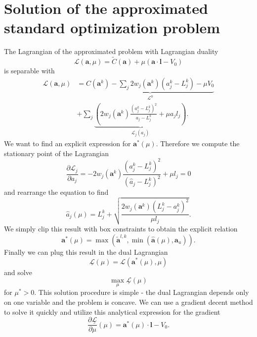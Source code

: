 \section{Solution of the approximated standard optimization problem}
\label{sec:sizing:solution}
The Lagrangian of the approximated problem with Lagrangian duality
\begin{equation}
    \mathcal{L}(\mathbf{a}, \mu) = \tilde{C}(\mathbf{a}) + \mu \left( \mathbf{a} \cdot \mathbf{l} - V_0 \right)
\end{equation}
is separable with 
\begin{equation}
    \begin{split}
        \mathcal{L}(\mathbf{a}, \mu) &= \underbrace{C(\mathbf{a}^k) - \sum_j 2w_j (\mathbf{a}^k) (a^k_j-L^k_j) - \mu V_0}_{\mathcal{L}^0} \\
        &+ \sum_j \underbrace{\left(2 w_j (\mathbf{a}^k)
        \frac{(a^k_j-L^k_j)^2}{a_j-L^k_j} + \mu a_j l_j \right)}_{\mathcal{L}_j (a_j)}.
    \end{split}
\end{equation}
We want to find an explicit expression for $\mathbf{a}^*(\mu)$. Therefore we compute the stationary point of the Lagrangian
\begin{equation}
    \frac{\partial \mathcal{L}_j}{\partial a_j} = -2 w_j (\mathbf{a}^k)
    \frac{(a^k_j-L^k_j)^2}{(\hat{a}_j-L^k_j)^2} + \mu l_j = 0
\end{equation}
and rearrange the equation to find 
\begin{equation}
    \hat{a}_j(\mu) = L_j^k + \sqrt{\frac{2 w_j (\mathbf{a}^k)
    (L^k_j-a^k_j)^2}{\mu l_j}}. 
\end{equation}
We simply clip this result with box constraints to obtain the explicit relation 
\begin{equation}
    \mathbf{a}^* (\mu) = \max\left(\tilde{\mathbf{a}}^{l,k}, \min \left(\hat{\mathbf{a}}(\mu), \mathbf{a}_u \right)\right). 
\end{equation}
Finally we can plug this result in the dual Lagrangian 
\begin{equation}
    \underline{\mathcal{L}}(\mu) = \mathcal{L}(\mathbf{a}^* (\mu), \mu)
\end{equation}
and solve 
\begin{equation}
    \max_{\mu} \underline{\mathcal{L}}(\mu)
\end{equation}
for $\mu^*>0$. This solution procedure is simple - the dual Lagrangian depends only on one variable and the problem is concave. We can use a gradient decent method to solve it quickly and utilize this analytical expression for the gradient 
\begin{equation}
    \frac{\partial \underline{\mathcal{L}}}{\partial \mu}(\mu) =  \mathbf{a}^* (\mu) \cdot \mathbf{l} - V_0.
\end{equation}



